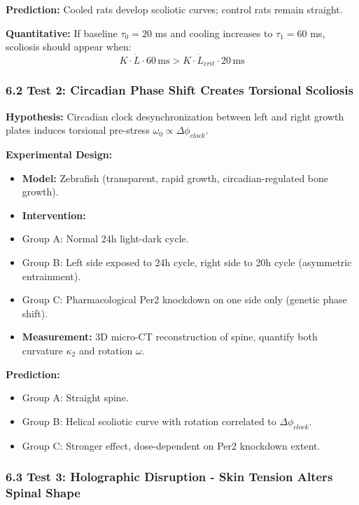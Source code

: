 \documentclass[11pt,a4paper]{article}
\begin{document}
\textbf{Prediction:} Cooled rats develop scoliotic curves; control rats remain straight.

\textbf{Quantitative:} If baseline $\tau_0 = 20$ ms and cooling increases to $\tau_1 = 60$ ms, scoliosis should appear when:
$$
K \cdot \dot{L} \cdot 60 \, \text{ms} > K \cdot \dot{L}_{crit} \cdot 20 \, \text{ms}
$$

\subsubsection{6.2 Test 2: Circadian Phase Shift Creates Torsional Scoliosis}

\textbf{Hypothesis:} Circadian clock desynchronization between left and right growth plates induces torsional pre-stress $\omega_0 \propto \Delta \phi_{clock}$.

\textbf{Experimental Design:}

\begin{itemize}
\item \textbf{Model:} Zebrafish (transparent, rapid growth, circadian-regulated bone growth).
\item \textbf{Intervention:}
\item Group A: Normal 24h light-dark cycle.
\item Group B: Left side exposed to 24h cycle, right side to 20h cycle (asymmetric entrainment).
\item Group C: Pharmacological Per2 knockdown on one side only (genetic phase shift).
\item \textbf{Measurement:} 3D micro-CT reconstruction of spine, quantify both curvature $\kappa_2$ and rotation $\omega$.
\end{itemize}

\textbf{Prediction:}

\begin{itemize}
\item Group A: Straight spine.
\item Group B: Helical scoliotic curve with rotation correlated to $\Delta \phi_{clock}$.
\item Group C: Stronger effect, dose-dependent on Per2 knockdown extent.
\end{itemize}

\subsubsection{6.3 Test 3: Holographic Disruption - Skin Tension Alters Spinal Shape}
\end{document}
